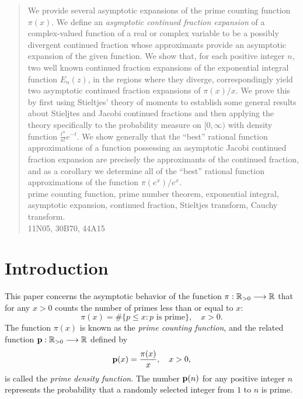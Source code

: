 \documentclass[12pt]{article}
\begin{document}
\begin{abstract}
We provide several asymptotic expansions of the prime counting function $\pi(x)$.   We define an {\it asymptotic continued fraction expansion} of a complex-valued function of a real or complex variable to be a possibly divergent continued fraction whose approximants provide an asymptotic expansion of the given function.  We show that,  for each positive integer $n$,  two well known continued fraction expansions of the exponential integral function $E_n(z)$, in the regions where they diverge,  correspondingly yield two asymptotic continued fraction expansions of $\pi(x)/x$.  We prove this by first using Stieltjes' theory of moments to establish some general results about Stieljtes and Jacobi continued fractions and then applying the theory specifically to the probability measure on $[0,\infty)$ with density function $\frac{t^n}{n!}e^{-t}$.   We show generally that the ``best'' rational function approximations of a function possessing an asymptotic Jacobi  continued fraction expansion are precisely the approximants of the continued fraction, and as a corollary we determine all of the ``best'' rational function approximations of the function $\pi(e^x)/e^x$.    \\

  prime counting function, prime number theorem, exponential integral,  asymptotic expansion, continued fraction, Stieltjes transform, Cauchy transform. \\

   11N05, 30B70,  44A15
\end{abstract}


\bigskip

\section{Introduction}






This paper concerns the asymptotic behavior of the function $\pi: {\mathbb R}_{>0} \longrightarrow {\mathbb R}$ that for any $x > 0$ counts the number of primes less than or equal to $x$: $$\pi(x) =   \# \{p \leq x: p \mbox{ is prime}\}, \quad x > 0.$$  The function $\pi(x)$ is known as the {\it prime counting function}, and the related function ${\mathbf p}: {\mathbb R}_{> 0} \longrightarrow {\mathbb R}$ defined by $${\mathbf p}(x) = \frac{\pi(x)}{x}, \quad x > 0,$$ is called the {\it prime density function}.  The number ${\mathbf p}(n)$ for any positive integer $n$ represents the probability that a randomly selected integer from $1$ to $n$ is prime.
\end{document}
